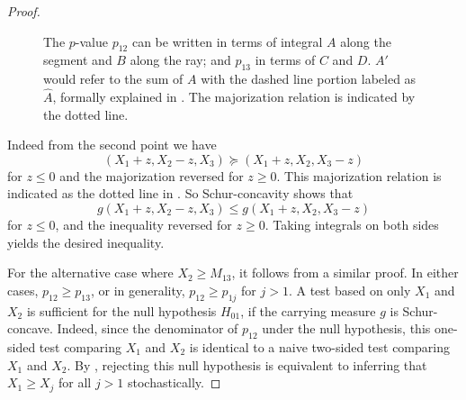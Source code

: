 \documentclass[11pt]{article}
\begin{document}
\begin{proof}
\begin{figure}[htbp]
\begin{center}
\end{center}
\caption{The $p$-value $p_{12}$ can be written in terms of integral $A$ along the segment and $B$ along the ray; and $p_{13}$ in terms of $C$ and $D$. $A'$ would refer to the sum of $A$ with the dashed line portion labeled as $\hat{A}$, formally explained in . The majorization relation is indicated by the dotted line.}
\label{fig:compare_rays}
\end{figure}

Indeed from the second point  we have
$$\left(X_1 + z, X_2 - z, X_3\right) \succeq \left(X_1 + z, X_2, X_3 - z\right)$$
for $z \le 0$ and the majorization reversed for $z \ge 0$. This majorization relation is indicated as the dotted line in . So Schur-concavity shows that
$$g\left(X_1 + z, X_2 - z, X_3\right) \le g\left(X_1 + z, X_2, X_3 - z\right)$$
for $z \le 0$, and the inequality reversed for $z \ge 0$. Taking integrals on both sides yields the desired inequality.

For the alternative case where $X_2 \ge M_{13}$, it follows from a similar proof. In either cases, $p_{12} \ge p_{13}$, or in generality, $p_{12} \ge p_{1j}$ for $j > 1$. A test based on only $X_1$ and $X_2$ is sufficient for the null hypothesis $H_{01}$, if the carrying measure $g$ is Schur-concave. Indeed, since the denominator of $p_{12}$ under the null hypothesis, this one-sided test comparing $X_1$ and $X_2$ is identical to a naive two-sided test comparing $X_1$ and $X_2$. By , rejecting this null hypothesis is equivalent to inferring that $X_1 \ge X_j$ for all $j>1$ stochastically.

\end{proof}
\end{document}
